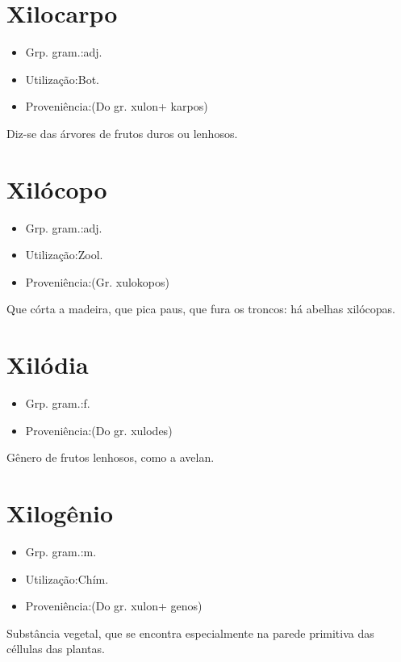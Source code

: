 \section{Xilocarpo}
\begin{itemize}
\item {Grp. gram.:adj.}
\end{itemize}
\begin{itemize}
\item {Utilização:Bot.}
\end{itemize}
\begin{itemize}
\item {Proveniência:(Do gr. \textunderscore xulon\textunderscore  + \textunderscore karpos\textunderscore )}
\end{itemize}
Diz-se das árvores de frutos duros ou lenhosos.
\section{Xilócopo}
\begin{itemize}
\item {Grp. gram.:adj.}
\end{itemize}
\begin{itemize}
\item {Utilização:Zool.}
\end{itemize}
\begin{itemize}
\item {Proveniência:(Gr. \textunderscore xulokopos\textunderscore )}
\end{itemize}
Que córta a madeira, que pica paus, que fura os troncos: \textunderscore há abelhas xilócopas\textunderscore .
\section{Xilódia}
\begin{itemize}
\item {Grp. gram.:f.}
\end{itemize}
\begin{itemize}
\item {Proveniência:(Do gr. \textunderscore xulodes\textunderscore )}
\end{itemize}
Gênero de frutos lenhosos, como a avelan.
\section{Xilogênio}
\begin{itemize}
\item {Grp. gram.:m.}
\end{itemize}
\begin{itemize}
\item {Utilização:Chím.}
\end{itemize}
\begin{itemize}
\item {Proveniência:(Do gr. \textunderscore xulon\textunderscore  + \textunderscore genos\textunderscore )}
\end{itemize}
Substância vegetal, que se encontra especialmente na parede primitiva das céllulas das plantas.
